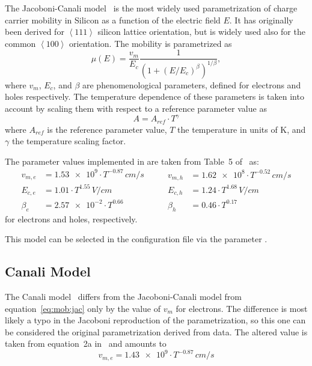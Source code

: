 The Jacoboni-Canali model~\cite{jacoboni} is the most widely used parametrization of charge carrier mobility in Silicon as a function of the electric field $E$.
It has originally been derived for $\left<111\right>$ silicon lattice orientation, but is widely used also for the common $\left<100\right>$ orientation.
The mobility is parametrized as
\begin{equation}
    \label{eq:mob:jac}
    \mu (E) = \frac{v_m}{E_c} \frac{1}{\left(1 + (E / E_c)^\beta \right)^{1 / \beta}},
\end{equation}
where $v_m$, $E_c$, and $\beta$ are phenomenological parameters, defined for electrons and holes respectively.
The temperature dependence of these parameters is taken into account by scaling them with respect to a reference parameter value as
\begin{equation}
    A = A_{ref} \cdot T^{\gamma}
\end{equation}
where $A_{ref}$ is the reference parameter value, $T$ the temperature in units of \si{K}, and $\gamma$ the temperature scaling factor.

The parameter values implemented in \apsq are taken from Table~5 of~\cite{jacoboni} as:
\begin{equation*}
    \begin{split}
        v_{m,e} &= \num{1.53e9} \cdot T^{-0.87}\,\si{cm \per s}\\
        E_{c,e} &= \num{1.01} \cdot T^{1.55}\,\si{V \per cm}\\
        \beta_e &= \num{2.57e-2} \cdot T^{0.66}
    \end{split}
    \qquad
    \begin{split}
        v_{m,h} &= \num{1.62e8} \cdot T^{-0.52}\,\si{cm \per s}\\
        E_{c,h} &= \num{1.24} \cdot T^{1.68}\,\si{V \per cm}\\
        \beta_h &= \num{0.46} \cdot T^{0.17}
    \end{split}
\end{equation*}
for electrons and holes, respectively.

This model can be selected in the configuration file via the parameter .

\subsection{Canali Model}
\label{sec:mob:can}

The Canali model~\cite{canali} differs from the Jacoboni-Canali model from equation~\eqref{eq:mob:jac} only by the value of $v_m$ for electrons.
The difference is most likely a typo in the Jacoboni reproduction of the parametrization, so this one can be considered the original parametrization derived from data.
The altered value is taken from equation~2a in~\cite{canali} and amounts to
\begin{equation*}
    v_{m,e} = \num{1.43e9} \cdot T^{-0.87}\,\si{cm \per s}
\end{equation*}

